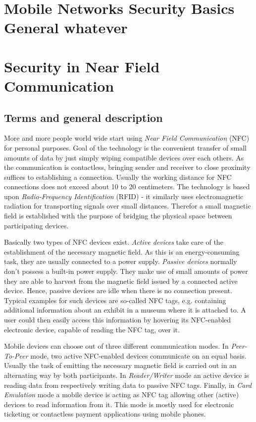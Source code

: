 \documentclass[12pt,a4paper]{article}
\begin{document}
\section{Mobile Networks Security Basics General whatever}

\section{Security in Near Field Communication}

\subsection{Terms and general description}

More and more people world wide start using \emph{Near Field Communication} (NFC) for personal purposes. Goal of the technology is the convenient transfer of small amounts of data by just simply wiping compatible devices over each others. As the communication is contactless, bringing sender and receiver to close proximity suffices to establishing a connection. Usually the working distance for NFC connections does not exceed about 10 to 20 centimeters. The technology is based upon \emph{Radio-Frequency Identification} (RFID) - it 	similarly uses electromagnetic radiation for transporting signals over small distances. Therefor a small magnetic field is established with the purpose of bridging the physical space between participating devices.

Basically two types of NFC devices exist. \emph{Active devices} take care of the establishment of the necessary magnetic field. As this is an energy-consuming task, they are usually connected to a power supply. \emph{Passive devices} normally don't possess a built-in power supply. They make use of small amounts of power they are able to harvest from the magnetic field issued by a connected active device. Hence, passive devices are idle when there is no connection present. Typical examples for such devices are so-called NFC tags, e.g. containing additional information about an exhibit in a museum where it is attached to. A user could then easily access this information by hovering its NFC-enabled electronic device, capable of reading the NFC tag, over it.

Mobile devices can choose out of three different communication modes. In \emph{Peer-To-Peer} mode, two active NFC-enabled devices communicate on an equal basis. Usually the task of emitting the necessary magnetic field is carried out in an alternating way by both participants. In \emph{Reader/Writer} mode an active device is reading data from respectively writing data to passive NFC tags. Finally, in \emph{Card Emulation} mode a mobile device is acting as NFC tag allowing other (active) devices to read information from it. This mode is mostly used for electronic ticketing or contactless payment applications using mobile phones.
\end{document}
